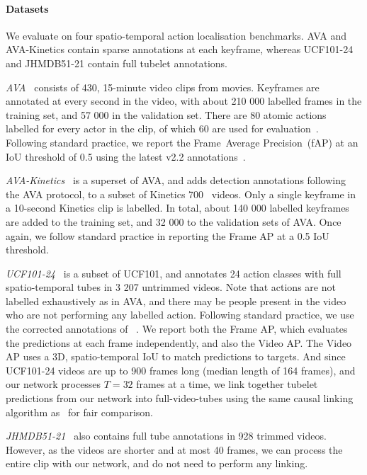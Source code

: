 \documentclass[10pt,twocolumn,letterpaper]{article}
\begin{document}
\paragraph{Datasets}
We evaluate on four spatio-temporal action localisation benchmarks.
AVA and AVA-Kinetics contain sparse annotations at each keyframe, whereas UCF101-24 and JHMDB51-21 contain full tubelet annotations.


\textit{AVA~\cite{gu_cvpr_2018}} consists of 430, 15-minute video clips from movies.
Keyframes are annotated at every second in the video, with about 210 000 labelled frames in the training set, and 57 000 in the validation set.
There are 80 atomic actions labelled for every actor in the clip, of which 60 are used for evaluation~\cite{gu_cvpr_2018}. 
Following standard practice, we report the Frame~Average Precision~(fAP) at an IoU threshold of 0.5 using the latest v2.2 annotations~\cite{gu_cvpr_2018}.

\textit{AVA-Kinetics~\cite{li2020ava}} is a superset of AVA, and adds detection annotations following the AVA protocol, to a subset of Kinetics 700~\cite{carreira2019short} videos.
Only a single keyframe in a 10-second Kinetics clip is labelled.
In total, about 140 000 labelled keyframes are added to the training set, and 32 000 to the validation sets of AVA. 
Once again, we follow standard practice in reporting the Frame AP at a 0.5 IoU threshold. 

\textit{UCF101-24~\cite{soomro_arxiv_2012}} is a subset of UCF101, and annotates 24 action classes 
with full spatio-temporal tubes in 3 207 untrimmed videos.
Note that actions are not labelled exhaustively as in AVA, and there may be people present in the video who are not performing any labelled action.
Following standard practice, we use the corrected annotations of ~\cite{singh_iccv_2017}.
We report both the Frame AP, which evaluates the predictions at each frame independently, and also the Video AP.
The Video AP uses a 3D, spatio-temporal IoU to match predictions to targets.
And since UCF101-24 videos are up to 900 frames long (median length of 164 frames), and our network processes $T=32$ frames at a time, we link together tubelet predictions from our network into full-video-tubes using the same causal linking algorithm as~\cite{kalogeiton_iccv_2017, li2020actions} for fair comparison.

\textit{JHMDB51-21~\cite{jhuang2013towards}} also contains full tube annotations in 928 trimmed videos.
However, as the videos are shorter and at most 40 frames, we can process the entire clip with our network, and do not need to perform any linking.
\end{document}
